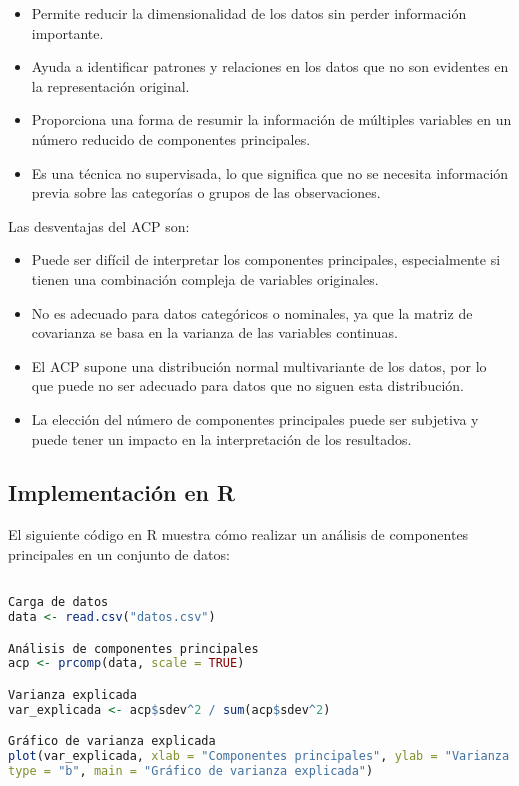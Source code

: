 \documentclass{article}
\begin{document}
\begin{itemize}
\begin{itemize}
\item Permite reducir la dimensionalidad de los datos sin perder información importante.
\item Ayuda a identificar patrones y relaciones en los datos que no son evidentes en la representación original.
\item Proporciona una forma de resumir la información de múltiples variables en un número reducido de componentes principales.
\item Es una técnica no supervisada, lo que significa que no se necesita información previa sobre las categorías o grupos de las observaciones.
\end{itemize}

Las desventajas del ACP son:

\begin{itemize}
\item Puede ser difícil de interpretar los componentes principales, especialmente si tienen una combinación compleja de variables originales.
\item No es adecuado para datos categóricos o nominales, ya que la matriz de covarianza se basa en la varianza de las variables continuas.
\item El ACP supone una distribución normal multivariante de los datos, por lo que puede no ser adecuado para datos que no siguen esta distribución.
\item La elección del número de componentes principales puede ser subjetiva y puede tener un impacto en la interpretación de los resultados.
\end{itemize}

\subsection*{Implementación en R}

El siguiente código en R muestra cómo realizar un análisis de componentes principales en un conjunto de datos:

\begin{lstlisting}[language=R]

Carga de datos
data <- read.csv("datos.csv")

Análisis de componentes principales
acp <- prcomp(data, scale = TRUE)

Varianza explicada
var_explicada <- acp$sdev^2 / sum(acp$sdev^2)

Gráfico de varianza explicada
plot(var_explicada, xlab = "Componentes principales", ylab = "Varianza explicada",
type = "b", main = "Gráfico de varianza explicada")


\end{lstlisting}
\end{itemize}
\end{document}
